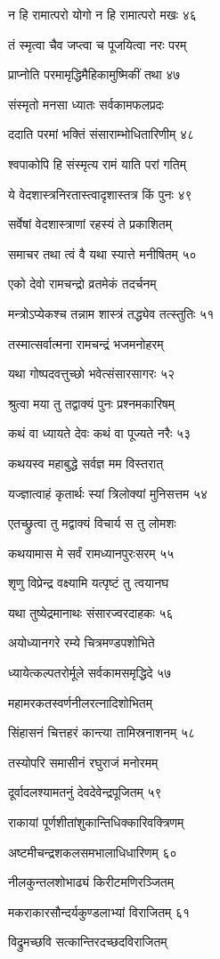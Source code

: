 न हि रामात्परो योगो न हि रामात्परो मखः ४६

तं स्मृत्वा चैव जप्त्वा च पूजयित्वा नरः परम्

प्राप्नोति परमामृद्धिमैहिकामुष्मिकीं तथा ४७

संस्मृतो मनसा ध्यातः सर्वकामफलप्रदः

ददाति परमां भक्तिं संसाराम्भोधितारिणीम् ४८

श्वपाकोपि हि संस्मृत्य रामं याति परां गतिम्

ये वेदशास्त्रनिरतास्त्वादृशास्तत्र किं पुनः ४९

सर्वेषां वेदशास्त्राणां रहस्यं ते प्रकाशितम्

समाचर तथा त्वं वै यथा स्यात्ते मनीषितम् ५०

एको देवो रामचन्द्रो व्रतमेकं तदर्चनम्

मन्त्रोऽप्येकश्च तन्नाम शास्त्रं तद्ध्येव तत्स्तुतिः ५१

तस्मात्सर्वात्मना रामचन्द्रं भजमनोहरम्

यथा गोष्पदवत्तुच्छो भवेत्संसारसागरः ५२

श्रुत्वा मया तु तद्वाक्यं पुनः प्रश्नमकारिषम्

कथं वा ध्यायते देवः कथं वा पूज्यते नरैः ५३

कथयस्व महाबुद्धे सर्वज्ञ मम विस्तरात्

यज्ज्ञात्वाहं कृतार्थः स्यां त्रिलोक्यां मुनिसत्तम ५४

एतच्छ्रुत्वा तु मद्वाक्यं विचार्य स तु लोमशः

कथयामास मे सर्वं रामध्यानपुरःसरम् ५५

शृणु विप्रेन्द्र वक्ष्यामि यत्पृष्टं तु त्वयानघ

यथा तुष्येद्रमानाथः संसारज्वरदाहकः ५६

अयोध्यानगरे रम्ये चित्रमण्डपशोभिते

ध्यायेत्कल्पतरोर्मूले सर्वकामसमृद्धिदे ५७

महामरकतस्वर्णनीलरत्नादिशोभितम्

सिंहासनं चित्तहरं कान्त्या तामिस्रनाशनम् ५८

तस्योपरि समासीनं रघुराजं मनोरमम्

दूर्वादलश्यामतनुं देवदेवेन्द्रपूजितम् ५९

राकायां पूर्णशीतांशुकान्तिधिक्कारिवक्त्रिणम्

अष्टमीचन्द्रशकलसमभालाधिधारिणम् ६०

नीलकुन्तलशोभाढ्यं किरीटमणिरञ्जितम्

मकराकारसौन्दर्यकुण्डलाभ्यां विराजितम् ६१

विद्रुमच्छवि सत्कान्तिरदच्छदविराजितम्

